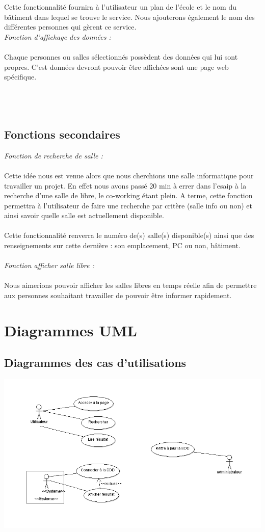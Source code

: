\documentclass[11pt,a4paper]{report}
\begin{document}
Cette fonctionnalité fournira à l’utilisateur un plan de l’école et le nom du bâtiment dans lequel se trouve le service. Nous ajouterons également le nom des différentes personnes qui gèrent ce service.\\

\emph{Fonction d'affichage des données :}  \\
\\
Chaque personnes ou salles sélectionnés possèdent des données qui lui sont propres. C'est données devront pouvoir être affichées sont une page web spécifique.\\
\\
\\
\\
	\section{Fonctions secondaires} 
\emph{Fonction de recherche de salle :}  \\
\\Cette idée nous est venue alors que nous cherchions une salle informatique pour travailler un projet. En effet nous avons passé 20 min à errer dans l’esaip à la recherche d’une salle de libre, le co-working étant plein. 
A terme, cette fonction permettra à l’utilisateur de faire une recherche par critère (salle info ou non) et ainsi savoir quelle salle est actuellement disponible.
\\
\\Cette fonctionnalité renverra le numéro de(s) salle(s) disponible(s) ainsi que des renseignements sur cette dernière : son emplacement, PC ou non, bâtiment.\\
\\
\emph{Fonction afficher salle libre :}	\\
\\Nous aimerions pouvoir afficher les salles libres en temps réelle afin de permettre aux personnes souhaitant travailler de pouvoir être informer rapidement.		
	\chapter{Diagrammes UML}
		\section{Diagrammes des cas d'utilisations}
			\begin{center}
					\includegraphics[scale=0.6]{d3}
			\end{center}
			
\end{document}
